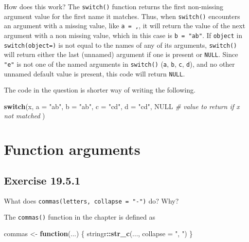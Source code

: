 \documentclass[]{book}
\newenvironment{Shaded}{\begin{snugshade}}{\end{snugshade}}
\newcommand{\CommentTok}[1]{\textcolor[rgb]{0.56,0.35,0.01}{\textit{#1}}}
\newcommand{\ControlFlowTok}[1]{\textcolor[rgb]{0.13,0.29,0.53}{\textbf{#1}}}
\newcommand{\DataTypeTok}[1]{\textcolor[rgb]{0.13,0.29,0.53}{#1}}
\newcommand{\KeywordTok}[1]{\textcolor[rgb]{0.13,0.29,0.53}{\textbf{#1}}}
\newcommand{\NormalTok}[1]{#1}
\newcommand{\OperatorTok}[1]{\textcolor[rgb]{0.81,0.36,0.00}{\textbf{#1}}}
\newcommand{\OtherTok}[1]{\textcolor[rgb]{0.56,0.35,0.01}{#1}}
\newcommand{\StringTok}[1]{\textcolor[rgb]{0.31,0.60,0.02}{#1}}
\theoremstyle{plain}
\theoremstyle{remark}
\theoremstyle{definition}
\theoremstyle{definition}
\theoremstyle{definition}
\theoremstyle{remark}
\begin{document}
How does this work? The \texttt{switch()} function returns the first
non-missing argument value for the first name it matches. Thus, when
\texttt{switch()} encounters an argument with a missing value, like
\texttt{a\ =\ ,}, it will return the value of the next argument with a
non missing value, which in this case is \texttt{b\ =\ "ab"}. If
\texttt{object} in \texttt{switch(object=)} is not equal to the names of
any of its arguments, \texttt{switch()} will return either the last
(unnamed) argument if one is present or \texttt{NULL}. Since
\texttt{"e"} is not one of the named arguments in \texttt{switch()}
(\texttt{a}, \texttt{b}, \texttt{c}, \texttt{d}), and no other unnamed
default value is present, this code will return \texttt{NULL}.

The code in the question is shorter way of writing the following.

\begin{Shaded}
\begin{Highlighting}[]
\ControlFlowTok{switch}\NormalTok{(x,}
  \DataTypeTok{a =} \StringTok{"ab"}\NormalTok{,}
  \DataTypeTok{b =} \StringTok{"ab"}\NormalTok{,}
  \DataTypeTok{c =} \StringTok{"cd"}\NormalTok{,}
  \DataTypeTok{d =} \StringTok{"cd"}\NormalTok{,}
  \OtherTok{NULL}  \CommentTok{# value to return if x not matched}
\NormalTok{)}
\end{Highlighting}
\end{Shaded}

\hypertarget{function-arguments}{%
\section{Function arguments}\label{function-arguments}}

\hypertarget{exercise-19.5.1}{%
\subsection*{\texorpdfstring{Exercise
{19.5.1}}{Exercise 19.5.1}}\label{exercise-19.5.1}}

What does \texttt{commas(letters,\ collapse\ =\ "-")} do? Why?

The \texttt{commas()} function in the chapter is defined as

\begin{Shaded}
\begin{Highlighting}[]
\NormalTok{commas <-}\StringTok{ }\ControlFlowTok{function}\NormalTok{(...) \{}
\NormalTok{  stringr}\OperatorTok{::}\KeywordTok{str_c}\NormalTok{(..., }\DataTypeTok{collapse =} \StringTok{", "}\NormalTok{)}
\NormalTok{\}}
\end{Highlighting}
\end{Shaded}
\end{document}
